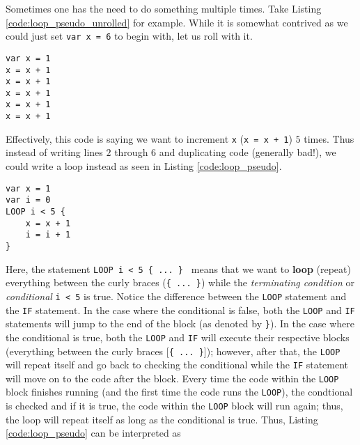 \documentclass{article}
\begin{document}
Sometimes one has the need to do something multiple times.
Take Listing \ref{code:loop_pseudo_unrolled} for example.
While it is somewhat contrived as we could just set \lstinline{var x = 6} to begin with, let us roll with it.
\begin{lstlisting}[caption={Unless you know what are you doing (you don't), don't do this.}, label={code:loop_pseudo_unrolled}]
var x = 1
x = x + 1
x = x + 1
x = x + 1
x = x + 1
x = x + 1
\end{lstlisting}
Effectively, this code is saying we want to increment \lstinline{x} (\lstinline{x = x + 1}) $5$ times.
Thus instead of writing lines $2$ through $6$ and duplicating code (generally bad!), we could write a loop instead as seen in Listing \ref{code:loop_pseudo}.
\begin{lstlisting}[caption={Loops are cool.}, label={code:loop_pseudo}]
var x = 1
var i = 0
LOOP i < 5 {
    x = x + 1
    i = i + 1
}
\end{lstlisting}
Here, the statement \lstinline|LOOP i < 5 { ... } | means that we want to \textbf{loop} (repeat) everything between the curly braces (\lstinline|{ ... }|) while the \textit{terminating condition} or \textit{conditional} \lstinline{i < 5} is true.
Notice the difference between the \lstinline{LOOP} statement and the \lstinline{IF} statement.
In the case where the conditional is false, both the \lstinline{LOOP} and \lstinline{IF} statements will jump to the end of the block (as denoted by \lstinline|}|).
In the case where the conditional is true, both the \lstinline{LOOP} and \lstinline{IF} will execute their respective blocks (everything between the curly braces [\lstinline|{ ... }|]); however, after that, the \lstinline{LOOP} will repeat itself and go back to checking the conditional while the \lstinline{IF} statement will move on to the code after the block.
Every time the code within the \lstinline{LOOP} block finishes running (and the first time the code runs the \lstinline{LOOP}), the condtional is checked and if it is true, the code within the \lstinline{LOOP} block will run again; thus, the loop will repeat itself as long as the conditional is true.
Thus, Listing \ref{code:loop_pseudo} can be interpreted as
\end{document}
